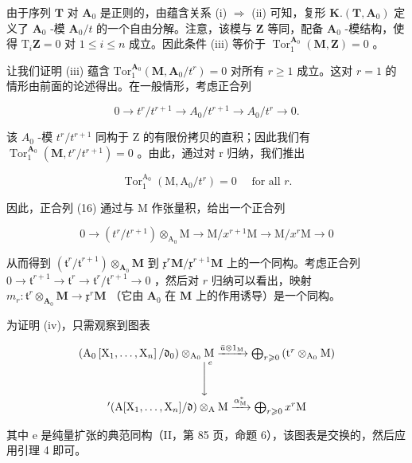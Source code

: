 由于序列 \(\mathbf{T}\) 对 \(\mathbf{A}_{0}\) 是正则的，由蕴含关系 (i) \(\Rightarrow\) (ii) 可知，复形 \(\mathbf{K}.\left(\mathbf{T},\mathbf{A}_{0}\right)\) 定义了 \(\mathbf{A}_{0}\) -模 \(\mathbf{A}_{0}/t\) 的一个自由分解。注意，该模与 \(\mathbf{Z}\) 等同，配备 \(\mathbf{A}_{0}\) -模结构，使得 \(\mathrm{T}_{i}\mathbf{Z}=0\) 对 \(1\leqslant i\leqslant n\) 成立。因此条件 (iii) 等价于 \(\operatorname{Tor}_{1}^{\mathbf{A}_{0}}(\mathbf{M},\mathbf{Z})=0\) 。

让我们证明 (iii) 蕴含 \(\mathrm{Tor}_{1}^{\mathbf{A}_{0}}(\mathbf{M},\mathbf{A}_{0}/t^{r})=0\) 对所有 \(r\geqslant1\) 成立。这对 \(r=1\) 的情形由前面的论述得出。在一般情形，考虑正合列

\[
0 \rightarrow t ^ {r} / t ^ {r + 1} \rightarrow A _ {0} / t ^ {r + 1} \rightarrow A _ {0} / t ^ {r} \rightarrow 0.\tag{16}
\]

该 \(A_{0}\) -模 \(t^{r}/t^{r+1}\) 同构于 Z 的有限份拷贝的直积；因此我们有 \(\operatorname{Tor}_{1}^{\mathbf{A}_{0}}(\mathbf{M}, t^{r}/t^{r+1}) = 0\) 。由此，通过对 r 归纳，我们推出

\[
\operatorname{Tor} _ {1} ^ {\mathrm{A} _ {0}} \left(\mathrm{M}, \mathrm{A} _ {0} / t ^ {r}\right) = 0 \quad \text { for   all } r.
\]

因此，正合列 (16) 通过与 M 作张量积，给出一个正合列

\[
0 \rightarrow (t ^ {r} / t ^ {r + 1}) \otimes_ {\mathrm{A} _ {0}} \mathrm{M} \rightarrow \mathrm{M} / x ^ {r + 1} \mathrm{M} \rightarrow \mathrm{M} / x ^ {r} \mathrm{M} \rightarrow 0\tag{17}
\]

从而得到 \((\mathfrak{t}^r /\mathfrak{t}^{r + 1})\otimes_{\mathbf{A}_0}\mathbf{M}\) 到 \(\mathfrak{x}^r\mathbf{M} / \mathfrak{x}^{r + 1}\mathbf{M}\) 上的一个同构。考虑正合列 \(0\to \mathfrak{t}^{r + 1}\to \mathfrak{t}^r\to \mathfrak{t}^r /\mathfrak{t}^{r + 1}\to 0\) ，然后对 \(r\) 归纳可以看出，映射 \(m_r:\mathfrak{t}^r\otimes_{\mathbf{A}_0}\mathbf{M}\rightarrow \mathfrak{x}^r\mathbf{M}\) （它由 \(\mathbf{A}_0\) 在 \(\mathbf{M}\) 上的作用诱导）是一个同构。

为证明 (iv)，只需观察到图表

\[
\begin{array}{c} \left(\mathrm{A} _ {0} \left[ \mathrm{X} _ {1}, \dots , \mathrm{X} _ {n} \right] / \mathfrak {d} _ {0}\right) \otimes_ {\mathrm{A} _ {0}} \mathrm{M} \xrightarrow {\bar {u} \otimes 1 _ {\mathrm{M}}} \bigoplus_ {r \geqslant 0} \left(\mathrm{t} ^ {r} \otimes_ {\mathrm{A} _ {0}} \mathrm{M}\right) \\ \Bigg \downarrow^ {e} \\ ^ {\prime} (\mathrm{A} [ \mathrm{X} _ {1}, \dots , \mathrm{X} _ {n} ] / \mathfrak {d}) \otimes_ {\mathrm{A}} \mathrm{M} \xrightarrow {\alpha_ {\mathrm{M}} ^ {*}} \bigoplus_ {r \geqslant 0} x ^ {r} \mathrm{M} \end{array}
\]

其中 e 是纯量扩张的典范同构（II，第 85 页，命题 6），该图表是交换的，然后应用引理 4 即可。

